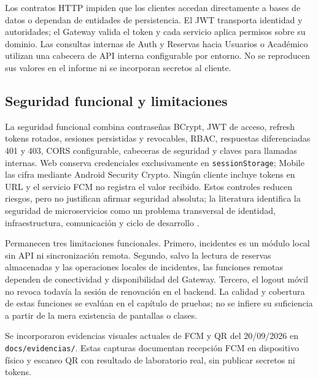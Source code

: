 Los contratos HTTP impiden que los clientes accedan directamente a bases de
datos o dependan de entidades de persistencia. El JWT transporta identidad y
autoridades; el Gateway valida el token y cada servicio aplica permisos sobre
su dominio. Las consultas internas de Auth y Reservas hacia Usuarios o
Académico utilizan una cabecera de API interna configurable por entorno. No se
reproducen sus valores en el informe ni se incorporan secretos al cliente.

\subsection{Seguridad funcional y limitaciones}
\label{subsec:seguridad-limitaciones-apps}

La seguridad funcional combina contraseñas BCrypt, JWT de acceso, refresh tokens
rotados, sesiones persistidas y revocables, RBAC, respuestas diferenciadas 401 y
403, CORS configurable, cabeceras de seguridad y claves para llamadas internas.
Web conserva credenciales exclusivamente en \texttt{sessionStorage}; Mobile las
cifra mediante Android Security Crypto. Ningún cliente incluye tokens en URL y
el servicio FCM no registra el valor recibido. Estos controles reducen riesgos,
pero no justifican afirmar seguridad absoluta; la literatura identifica la
seguridad de microservicios como un problema transversal de identidad,
infraestructura, comunicación y ciclo de desarrollo
\cite{berardi2022microservicesecurity}.

Permanecen tres limitaciones funcionales. Primero, incidentes es un módulo local
sin API ni sincronización remota. Segundo, salvo la lectura de reservas
almacenadas y las operaciones locales de incidentes, las funciones remotas
dependen de conectividad y disponibilidad del Gateway. Tercero, el logout móvil
no revoca todavía la sesión de renovación en el backend. La calidad y cobertura
de estas funciones se evalúan en el capítulo de pruebas; no se infiere su
suficiencia a partir de la mera existencia de pantallas o clases.

Se incorporaron evidencias visuales actuales de FCM y QR del 20/09/2026 en
\texttt{docs/evidencias/}. Estas capturas documentan recepción FCM en dispositivo
físico y escaneo QR con resultado de laboratorio real, sin publicar secretos ni
tokens.

